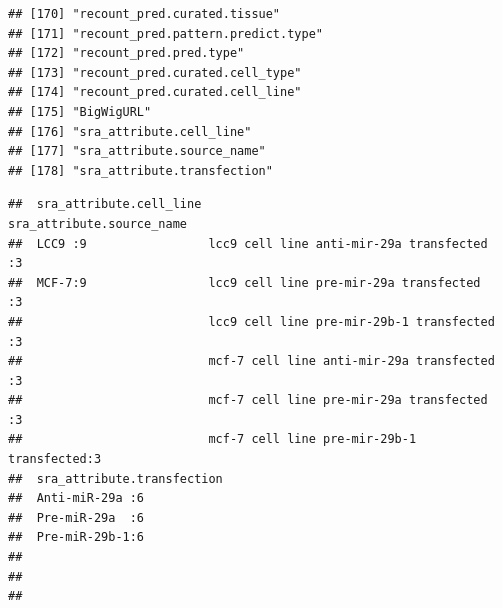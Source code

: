 \documentclass[
]{article}
\newenvironment{Shaded}{\begin{snugshade}}{\end{snugshade}}
\newcommand{\CommentTok}[1]{\textcolor[rgb]{0.56,0.35,0.01}{\textit{#1}}}
\newcommand{\DocumentationTok}[1]{\textcolor[rgb]{0.56,0.35,0.01}{\textbf{\textit{#1}}}}
\newcommand{\FunctionTok}[1]{\textcolor[rgb]{0.13,0.29,0.53}{\textbf{#1}}}
\newcommand{\NormalTok}[1]{#1}
\newcommand{\OtherTok}[1]{\textcolor[rgb]{0.56,0.35,0.01}{#1}}
\newcommand{\SpecialCharTok}[1]{\textcolor[rgb]{0.81,0.36,0.00}{\textbf{#1}}}
\newcommand{\StringTok}[1]{\textcolor[rgb]{0.31,0.60,0.02}{#1}}
\begin{document}
\begin{verbatim}
## [170] "recount_pred.curated.tissue"                                       
## [171] "recount_pred.pattern.predict.type"                                 
## [172] "recount_pred.pred.type"                                            
## [173] "recount_pred.curated.cell_type"                                    
## [174] "recount_pred.curated.cell_line"                                    
## [175] "BigWigURL"                                                         
## [176] "sra_attribute.cell_line"                                           
## [177] "sra_attribute.source_name"                                         
## [178] "sra_attribute.transfection"
\end{verbatim}

\begin{Shaded}
\end{Shaded}

\begin{verbatim}
##  sra_attribute.cell_line                             sra_attribute.source_name
##  LCC9 :9                 lcc9 cell line anti-mir-29a transfected  :3          
##  MCF-7:9                 lcc9 cell line pre-mir-29a transfected   :3          
##                          lcc9 cell line pre-mir-29b-1 transfected :3          
##                          mcf-7 cell line anti-mir-29a transfected :3          
##                          mcf-7 cell line pre-mir-29a transfected  :3          
##                          mcf-7 cell line pre-mir-29b-1 transfected:3          
##  sra_attribute.transfection
##  Anti-miR-29a :6           
##  Pre-miR-29a  :6           
##  Pre-miR-29b-1:6           
##                            
##                            
## 
\end{verbatim}
\end{document}
